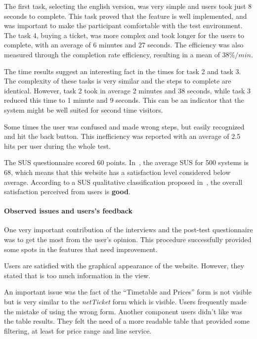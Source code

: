 \documentclass[a4paper]{article}
\begin{document}
The first task, selecting the english version, was very simple and users took just 8 seconds to complete. This task proved that the feature is well implemented, and was important to make the participant comfortable with the test environment. The task 4, buying a ticket, was more complex and took longer for the users to complete, with an average of 6 minutes and 27 seconds. The efficiency was also measured through the completion rate efficiency, resulting in a mean of $38\%/min$.

The time results suggest an interesting fact in the times for task 2 and task 3. The complexity of these tasks is very similar and the steps to complete are identical. However, task 2 took in average 2 minutes and 38 seconds, while task 3 reduced this time to 1 minute and 9 seconds. This can be an indicator that the system might be well suited for second time visitors.

Some times the user was confused and made wrong steps, but easily recognized and hit the back button. This inefficiency was reported with an average of 2.5 hits per user during the whole test.

The SUS questionnaire scored 60 points. In~\citep{sauro2011measuring}, the average SUS for 500 systems is 68, which means that this website has a satisfaction level considered below average. According to a SUS qualitative classification proposed in~\citep{bangor2009determining}, the overall satisfaction perceived from users is \textbf{good}.

\paragraph{Observed issues and users's feedback}
One very important contribution of the interviews and the post-test questionnaire was to get the most from the user's opinion. This procedure successfully provided some spots in the features that need improvement. 

Users are satisfied with the graphical appearance of the website. However, they stated that is too much information in the view.

An important issue was the fact of the ``Timetable and Prices'' form is not visible but is very similar to the \emph{netTicket} form which is visible. Users frequently made the mistake of using the wrong form. Another component users didn't like was the table results. They felt the need of a more readable table that provided some filtering, at least for price range and line service.
\end{document}
